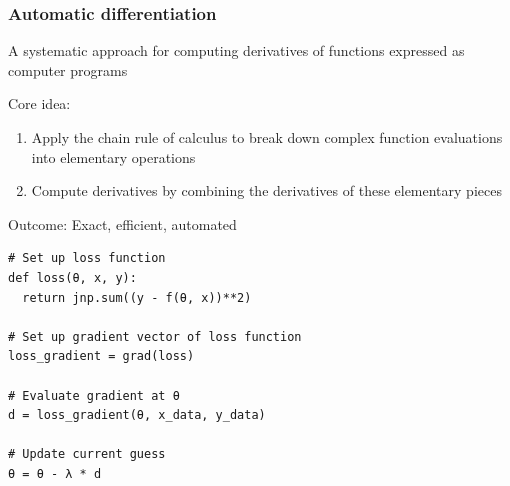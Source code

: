 \begin{frame}
    \frametitle{Automatic differentiation}

    \begin{figure}
       \begin{center}
       \end{center}
    \end{figure}

\end{frame}


\begin{frame}

    A systematic approach for computing derivatives of functions expressed as computer programs

        \vspace{0.5em}
    Core idea:

        \vspace{0.5em}
    \begin{enumerate}
        \item Apply the chain rule of calculus to break down complex function evaluations into elementary operations
        \vspace{0.5em}
        \item Compute derivatives by combining the derivatives of these elementary pieces
    \end{enumerate}

        \vspace{0.5em}
        \vspace{0.5em}
        \vspace{0.5em}
    Outcome: Exact, efficient, automated 

\end{frame}

\begin{frame}[fragile]
    
    
    \begin{verbatim}
# Set up loss function
def loss(θ, x, y):
  return jnp.sum((y - f(θ, x))**2)

# Set up gradient vector of loss function
loss_gradient = grad(loss)

# Evaluate gradient at θ
d = loss_gradient(θ, x_data, y_data)

# Update current guess
θ = θ - λ * d
    \end{verbatim}

\end{frame}

